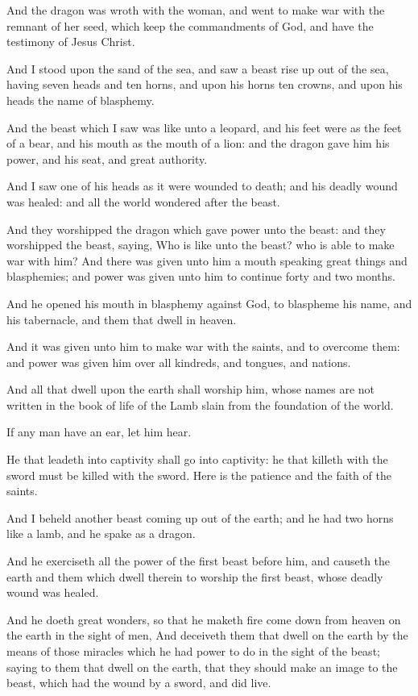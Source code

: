 \Verse And the dragon was wroth with the woman, and went to make war with the remnant of her seed, which keep the commandments of God, and have the testimony of Jesus Christ.

\Chapter
\Verse And I stood upon the sand of the sea, and saw a beast rise up out of the sea, having seven heads and ten horns, and upon his horns ten crowns, and upon his heads the name of blasphemy.

\Verse And the beast which I saw was like unto a leopard, and his feet were as the feet of a bear, and his mouth as the mouth of a lion: and the dragon gave him his power, and his seat, and great authority.

\Verse And I saw one of his heads as it were wounded to death; and his deadly wound was healed: and all the world wondered after the beast.

\Verse And they worshipped the dragon which gave power unto the beast: and they worshipped the beast, saying, Who is like unto the beast? who is able to make war with him?  \Verse And there was given unto him a mouth speaking great things and blasphemies; and power was given unto him to continue forty and two months.

\Verse And he opened his mouth in blasphemy against God, to blaspheme his name, and his tabernacle, and them that dwell in heaven.

\Verse And it was given unto him to make war with the saints, and to overcome them: and power was given him over all kindreds, and tongues, and nations.

\Verse And all that dwell upon the earth shall worship him, whose names are not written in the book of life of the Lamb slain from the foundation of the world.

\Verse If any man have an ear, let him hear.

\Verse He that leadeth into captivity shall go into captivity: he that killeth with the sword must be killed with the sword. Here is the patience and the faith of the saints.

\Verse And I beheld another beast coming up out of the earth; and he had two horns like a lamb, and he spake as a dragon.

\Verse And he exerciseth all the power of the first beast before him, and causeth the earth and them which dwell therein to worship the first beast, whose deadly wound was healed.

\Verse And he doeth great wonders, so that he maketh fire come down from heaven on the earth in the sight of men, \Verse And deceiveth them that dwell on the earth by the means of those miracles which he had power to do in the sight of the beast; saying to them that dwell on the earth, that they should make an image to the beast, which had the wound by a sword, and did live.

